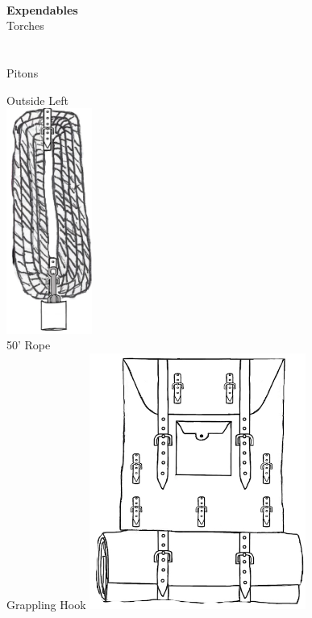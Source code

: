 \documentclass[11pt]{article}
\begin{document}
\\
\begin{minipage}[t]{.4\textwidth}
\vspace{0.6cm}
{\huge \textbf{\Fontauri Expendables}}\\
\Large{\textcolor{OCRA}{Torches}}\\
    \\
\vspace{0.2cm}\\
\Large{\textcolor{OCRA}{Pitons}}\\
\end{minipage}
\newpage
\begin{paracol}{3}
    \centering
    \normalsize{Outside Left}\\
    \includegraphics[height=7.4cm]{img/rope.png}\\
    \normalsize{50' Rope\\Grappling Hook}
    \switchcolumn
    \centering 
    \includegraphics[height=8.4cm]{img/Backpack.png}\\

\end{paracol}
\end{document}
